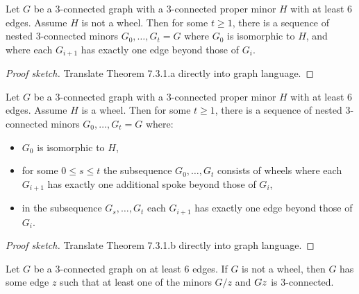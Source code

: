 \begin{corollary}[7.3.2.a]
  \label{cor:7.3.2.a}
  Let $G$ be a $3$-connected graph with a $3$-connected proper minor $H$ with at least $6$ edges. Assume $H$ is not a wheel. Then for some $t \geq 1$, there is a sequence of nested $3$-connected minors $G_{0}, \dots, G_{t} = G$ where $G_{0}$ is isomorphic to $H$, and where each $G_{i + 1}$ has exactly one edge beyond those of $G_{i}$.
\end{corollary}

\begin{proof}[Proof sketch]
  Translate Theorem 7.3.1.a directly into graph language.
\end{proof}

\begin{corollary}[7.3.2.b]
  \label{cor:7.3.2.b}
  Let $G$ be a $3$-connected graph with a $3$-connected proper minor $H$ with at least $6$ edges. Assume $H$ is a wheel. Then for some $t \geq 1$, there is a sequence of nested $3$-connected minors $G_{0}, \dots, G_{t} = G$ where:
  \begin{itemize}
    \item $G_{0}$ is isomorphic to $H$,
    \item for some $0 \leq s \leq t$ the subsequence $G_{0}, \dots, G_{t}$ consists of wheels where each $G_{i + 1}$ has exactly one additional spoke beyond those of $G_{i}$,
    \item in the subsequence $G_{s}, \dots, G_{t}$ each $G_{i + 1}$ has exactly one edge beyond those of $G_{i}$.
  \end{itemize}
\end{corollary}

\begin{proof}[Proof sketch]
  Translate Theorem 7.3.1.b directly into graph language.
\end{proof}

\begin{theorem}
  \label{thm:7.3.3}
  Let $G$ be a $3$-connected graph on at least $6$ edges. If $G$ is not a wheel, then $G$ has some edge $z$ such that at least one of the minors $G / z$ and $G \\ z$ is $3$-connected.
\end{theorem}

